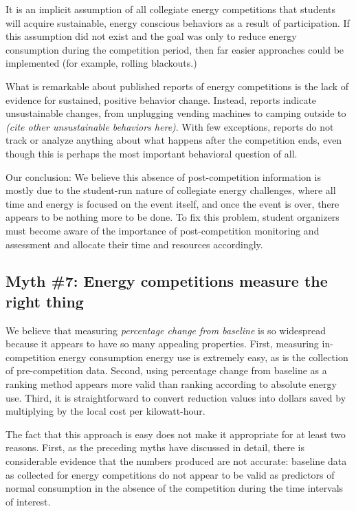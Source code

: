 \documentclass[jou]{apa} %
\begin{document}
It is an implicit assumption of all collegiate energy competitions that students will acquire
sustainable, energy conscious behaviors as a result of participation. If this assumption
did not exist and the goal was only to reduce energy consumption during the competition
period, then far easier approaches could be implemented (for example, rolling blackouts.)

What is remarkable about published reports of energy competitions is the lack of evidence
for sustained, positive behavior change. Instead, reports indicate unsustainable changes,
from unplugging vending machines \cite{Petersen07a} to camping outside \cite{Hodge2010} to 
{\em (cite other unsustainable behaviors here)}.   With few exceptions, reports do not
track or analyze anything about what happens after the competition ends, even though this
is perhaps the most important behavioral question of all.  

Our conclusion: We believe this absence of post-competition information is mostly due to
the student-run nature of collegiate energy challenges, where all time and energy is
focused on the event itself, and once the event is over, there appears to be nothing more
to be done. To fix this problem, student organizers must become aware of the importance of
post-competition monitoring and assessment and allocate their time and resources
accordingly.

\subsection{Myth \#7: Energy competitions measure the right thing}

We believe that measuring {\em percentage change from baseline} is so widespread because
it appears to have so many appealing properties.  First, measuring in-competition energy
consumption energy use is extremely easy, as is the collection of pre-competition data.
Second, using percentage change from baseline as a ranking method appears more valid than
ranking according to absolute energy use. Third, it is straightforward to convert reduction
values into dollars saved by multiplying by the local cost per kilowatt-hour.

The fact that this approach is easy does not make it appropriate for at least two
reasons.  First, as the preceding myths have discussed in detail, there is considerable
evidence that the numbers produced are not accurate: baseline data as collected for energy
competitions do not appear to be valid as predictors of normal consumption in the absence
of the competition during the time intervals of interest.  
\end{document}
